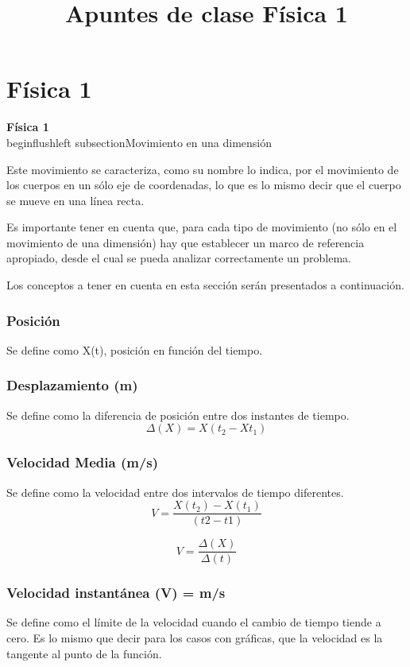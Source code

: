\documentclass{article}
\title{ Apuntes de clase F\'isica 1 \LateX}
\begin{document}
\maketitle
\date{}


\section{F\'isica 1}
\textbf{F\'isica 1}
\\begin{flushleft}
subsection{Movimiento en una dimensi\'on}

Este movimiento se caracteriza, como su nombre lo indica, por el movimiento de los cuerpos en un s\'olo eje de coordenadas, lo que es lo mismo decir que el cuerpo se mueve en una l\'inea recta.

Es importante tener en cuenta que, para cada tipo de movimiento (no s\'olo en el movimiento de una dimensi\'on) hay que establecer un marco de referencia apropiado, desde el cual se pueda analizar correctamente un problema.

Los conceptos a tener en cuenta en esta secci\'on ser\'an presentados a continuaci\'on.

\subsubsection{Posici\'on}
Se define como X(t), posici\'on en funci\'on del tiempo.

\subsubsection{Desplazamiento (m)}
Se define como la diferencia de posici\'on entre dos instantes de tiempo.
\begin{equation}
\Delta(X) = X(t_{2} - Xt_{1} )
\end{equation}

\subsubsection{Velocidad Media (m/s)}
Se define como la velocidad entre dos intervalos de tiempo diferentes.
\begin{equation}
V= \dfrac{X(t_{2}) -X(t_{1})}{(t2-t1)}
\end{equation}

\begin{equation}
V=\dfrac{ \Delta(X)}{\Delta(t)}
\end{equation}

\subsubsection{Velocidad instant\'anea (V) = m/s}
Se define como el l\'imite de la velocidad cuando el cambio de tiempo tiende a cero. Es lo mismo que decir para los casos con gr\'aficas, que la velocidad es la tangente al punto de la funci\'on.
\end{document}
